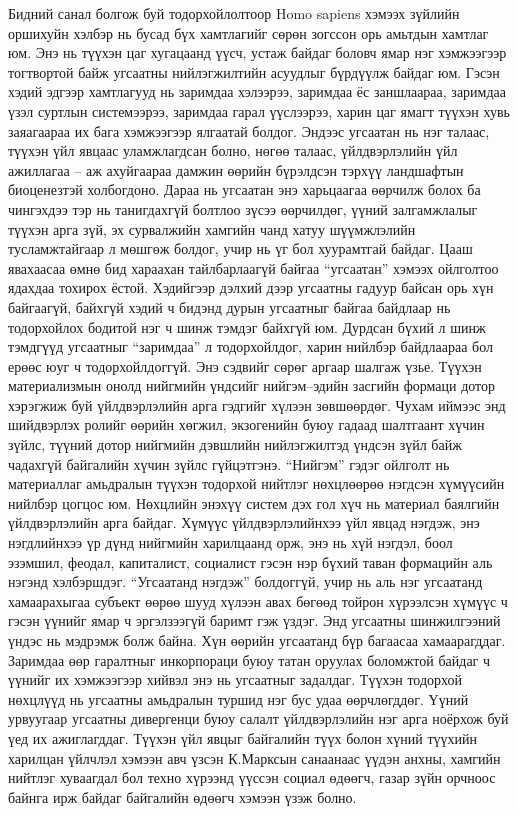 Бидний санал болгож буй тодорхойлолтоор Homo sapiens хэмээх зүйлийн оршихуйн хэлбэр нь бусад бүх хамтлагийг сөрөн зогссон орь амьтдын хамтлаг юм. Энэ нь түүхэн цаг хугацаанд үүсч, устаж байдаг боловч ямар нэг хэмжээгээр тогтвортой байж угсаатны нийлэгжилтийн асуудлыг бүрдүүлж байдаг юм. Гэсэн хэдий эдгээр хамтлагууд нь заримдаа хэлээрээ, заримдаа ёс заншлаараа, заримдаа үзэл суртлын системээрээ, заримдаа гарал үүслээрээ, харин цаг ямагт түүхэн хувь заяагаараа их бага хэмжээгээр ялгаатай болдог. Эндээс угсаатан нь нэг талаас, түүхэн үйл явцаас уламжлагдсан болно, нөгөө талаас, үйлдвэрлэлийн үйл ажиллагаа – аж ахуйгаараа дамжин өөрийн бүрэлдсэн тэрхүү ландшафтын биоценезтэй холбогдоно. Дараа нь угсаатан энэ харьцаагаа өөрчилж болох ба чингэхдээ тэр нь танигдахгүй болтлоо зүсээ өөрчилдөг, үүний залгамжлалыг түүхэн арга зүй, эх сурвалжийн хамгийн чанд хатуу шүүмжлэлийн тусламжтайгаар л мөшгөж болдог, учир нь үг бол хуурамтгай байдаг.
Цааш явахаасаа өмнө бид хараахан тайлбарлаагүй байгаа “угсаатан” хэмээх ойлголтоо ядахдаа тохирох ёстой. Хэдийгээр дэлхий дээр угсаатны гадуур байсан орь хүн байгаагүй, байхгүй хэдий ч бидэнд дурын угсаатныг байгаа байдлаар нь тодорхойлох бодитой нэг ч шинж тэмдэг байхгүй юм. Дурдсан бүхий л шинж тэмдгүүд угсаатныг “заримдаа” л тодорхойлдог, харин нийлбэр байдлаараа бол ерөөс юуг ч тодорхойлдоггүй. Энэ сэдвийг сөрөг аргаар шалгаж үзье.
Түүхэн материализмын онолд нийгмийн үндсийг нийгэм–эдийн засгийн формаци дотор хэрэгжиж буй үйлдвэрлэлийн арга гэдгийг хүлээн зөвшөөрдөг. Чухам иймээс энд шийдвэрлэх ролийг өөрийн хөгжил, экзогенийн буюу гадаад шалтгаант хүчин зүйлс, түүний дотор нийгмийн дэвшлийн нийлэгжилтэд үндсэн зүйл байж чадахгүй байгалийн хүчин зүйлс гүйцэтгэнэ. “Нийгэм” гэдэг ойлголт нь материаллаг амьдралын түүхэн тодорхой нийтлэг нөхцлөөрөө нэгдсэн хүмүүсийн нийлбэр цогцос юм. Нөхцлийн энэхүү систем дэх гол хүч нь материал баялгийн үйлдвэрлэлийн арга байдаг. Хүмүүс үйлдвэрлэлийнхээ үйл явцад нэгдэж, энэ нэгдлийнхээ үр дүнд нийгмийн харилцаанд орж, энэ нь хүй нэгдэл, боол эзэмшил, феодал, капиталист, социалист гэсэн нэр бүхий таван формацийн аль нэгэнд хэлбэршдэг.
“Угсаатанд нэгдэж” болдоггүй, учир нь аль нэг угсаатанд хамаарахыгаа субъект өөрөө шууд хүлээн авах бөгөөд тойрон хүрээлсэн хүмүүс ч гэсэн үүнийг ямар ч эргэлзээгүй баримт гэж үздэг. Энд угсаатны шинжилгээний үндэс нь мэдрэмж болж байна. Хүн өөрийн угсаатанд бүр багаасаа хамаарагддаг. Заримдаа өөр гаралтныг инкорпораци буюу татан оруулах боломжтой байдаг ч үүнийг их хэмжээгээр хийвэл энэ нь угсаатныг задалдаг. Түүхэн тодорхой нөхцлүүд нь угсаатны амьдралын туршид нэг бус удаа өөрчлөгддөг. Үүний урвуугаар угсаатны дивергенци буюу салалт үйлдвэрлэлийн нэг арга ноёрхож буй үед их ажиглагддаг. Түүхэн үйл явцыг байгалийн түүх болон хүний түүхийн харилцан үйлчлэл хэмээн авч үзсэн К.Марксын санаанаас үүдэн анхны, хамгийн нийтлэг хуваагдал бол техно хүрээнд үүссэн социал өдөөгч, газар зүйн орчноос байнга ирж байдаг байгалийн өдөөгч хэмээн үзэж болно.
